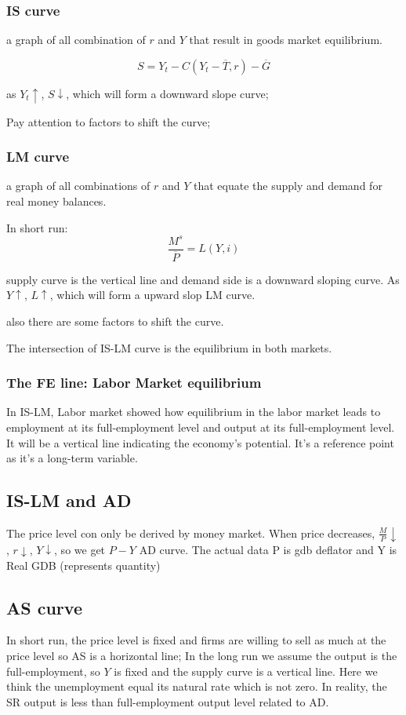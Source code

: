 \documentclass[10pt, a4paper]{article}
\begin{document}
        \subsubsection{IS curve}
            a graph of all combination of $r$ and $Y$ that result in goods market equilibrium.

            $$S = Y_t - C(Y_t - \overline{T}, r) - \overline{G}$$

            as $Y_t\uparrow$, $S\downarrow$, which will form a downward slope curve; 

            Pay attention to factors to shift the curve; 
        \subsubsection{LM curve}
        
        a graph of all combinations of $r$ and $Y$ that equate the supply and demand for real money balances.

        In short run: 
            $$\frac{M^s}{\overline{P}} = L(Y, i)$$

            supply curve is the vertical line and demand side is a downward sloping curve. As $Y\uparrow$, $L\uparrow$, which will form a upward slop LM curve.

            also there are some factors to shift the curve.  
       
            The intersection of IS-LM curve is the equilibrium in both markets. 
        \subsubsection{The FE line: Labor Market equilibrium}
            In IS-LM, Labor market showed how equilibrium in the labor market leads to employment at its full-employment level and output at its full-employment level. It will be a vertical line indicating the economy's potential. It's a reference point as it's a long-term variable. 
        \subsection{IS-LM and AD}
            The price level con only be derived by money market. When price decreases, $\frac{M}{P} \downarrow$, $r\downarrow$, $Y \downarrow$, so we get $P - Y$ AD curve. The actual data P is gdb deflator and Y is Real GDB (represents quantity)
        \subsection{AS curve}
            In short run, the price level is fixed and firms are willing to sell as much at the price level so AS is a horizontal line; In the long run we assume the output is the full-employment, so $Y$ is fixed and the supply curve is a vertical line. Here we think the unemployment equal its natural rate which is not zero. In reality, the SR output is less than full-employment output level related to AD.
\end{document}
